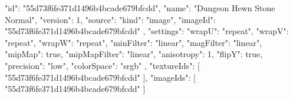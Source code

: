 {
  "id": "55d73f6fe371d1496b4bcade679bfcdd",
  "name": "Dungeon Hewn Stone Normal",
  "version": 1,
  "source": {
    "kind": "image",
    "imageId": "55d73f6fe371d1496b4bcade679bfcdd"
  },
  "settings": {
    "wrapU": "repeat",
    "wrapV": "repeat",
    "wrapW": "repeat",
    "minFilter": "linear",
    "magFilter": "linear",
    "mipMap": true,
    "mipMapFilter": "linear",
    "anisotropy": 1,
    "flipY": true,
    "precision": "low",
    "colorSpace": "srgb"
  },
  "textureIds": [
    "55d73f6fe371d1496b4bcade679bfcdd"
  ],
  "imageIds": [
    "55d73f6fe371d1496b4bcade679bfcdd"
  ]
}
